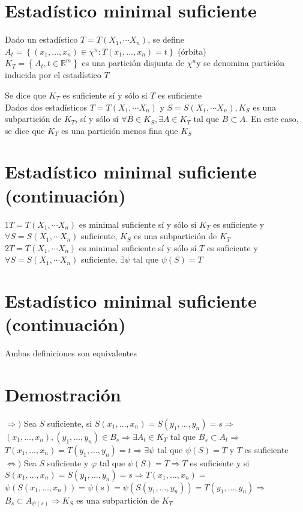 \section*{Estadístico minimal suficiente}
Dado un estadístico $T=T\left(X_{1}, \cdots X_{n}\right)$, se define $A_{t}=\left\{\left(x_{1}, \ldots, x_{n}\right) \in \chi^{n}: T\left(x_{1}, \ldots, x_{n}\right)=t\right\}$ (órbita)\\
$K_{T}=\left\{A_{t}, t \in \mathbb{R}^{m}\right\}$ es una partición disjunta de $\chi^{n} \mathrm{y}$ se denomina partición inducida por el estadístico $T$

Se dice que $K_{T}$ es suficiente sí y sólo si $T$ es suficiente\\
Dados dos estadísticos $T=T\left(X_{1}, \cdots X_{n}\right)$ y $S=S\left(X_{1}, \cdots X_{n}\right), K_{S}$ es una subpartición de $K_{T}$, sí y sólo sí $\forall B \in K_{S}, \exists A \in K_{T}$ tal que $B \subset A$. En este caso, se dice que $K_{T}$ es una partición menos fina que $K_{S}$

\section*{Estadístico minimal suficiente (continuación)}
$1 T=T\left(X_{1}, \cdots X_{n}\right)$ es minimal suficiente sí y sólo sí $K_{T}$ es suficiente y $\forall S=S\left(X_{1}, \cdots X_{n}\right)$ suficiente, $K_{S}$ es una subpartición de $K_{T}$\\
$2 T=T\left(X_{1}, \cdots X_{n}\right)$ es minimal suficiente sí y sólo sí $T$ es suficiente y $\forall S=S\left(X_{1}, \cdots X_{n}\right)$ suficiente, $\exists \psi$ tal que $\psi(S)=T$

\section*{Estadístico minimal suficiente (continuación)}
Ambas definiciones son equivalentes

\section*{Demostración}
$\Rightarrow)$ Sea $S$ suficiente, si $S\left(x_{1}, \ldots, x_{n}\right)=S\left(y_{1}, \ldots, y_{n}\right)=s \Rightarrow$ $\left(x_{1}, \ldots, x_{n}\right),\left(y_{1}, \ldots, y_{n}\right) \in B_{s} \Rightarrow \exists A_{t} \in K_{T}$ tal que $B_{s} \subset A_{t} \Rightarrow$ $T\left(x_{1}, \ldots, x_{n}\right)=T\left(y_{1}, \ldots, y_{n}\right)=t \Rightarrow \exists \psi$ tal que $\psi(S)=T$ y $T$ es suficiente\\
$\Leftrightarrow)$ Sea $S$ suficiente y $\varphi$ tal que $\psi(S)=T \Rightarrow T$ es suficiente y si $S\left(x_{1}, \ldots, x_{n}\right)=S\left(y_{1}, \ldots, y_{n}\right)=s \Rightarrow T\left(x_{1}, \ldots, x_{n}\right)=$ $\psi\left(S\left(x_{1}, \ldots, x_{n}\right)\right)=\psi(s)=\psi\left(S\left(y_{1}, \ldots, y_{n}\right)\right)=T\left(y_{1}, \ldots, y_{n}\right) \Rightarrow$ $B_{s} \subset A_{\psi(s)} \Rightarrow K_{S}$ es una subpartición de $K_{T}$

